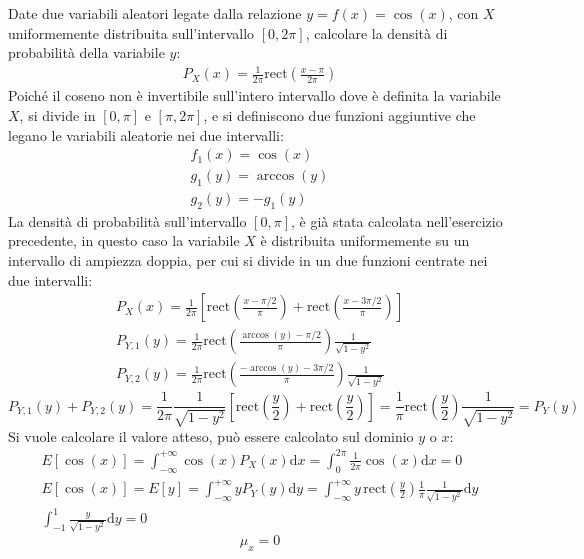 \documentclass{article}
\newcommand{\rect}{\mbox{rect}}
\newcommand{\df}{\mathrm{d}}
\begin{document}
Date due variabili aleatori legate dalla relazione $y=f(x)=\cos(x)$, con $X$ uniformemente distribuita sull'intervallo $[0,2\pi]$, calcolare la densità di probabilità 
della variabile $y$:
\begin{gather*}
    P_X(x)=\displaystyle\frac{1}{2\pi}\rect\left(\frac{x-\pi}{2\pi}\right)
\end{gather*}
Poiché il coseno non è invertibile sull'intero intervallo dove è definita la variabile $X$, si divide in $[0,\pi]$ e $[\pi,2\pi]$, e si definiscono due funzioni 
aggiuntive che legano le variabili aleatorie nei due intervalli:
\begin{gather*}
    f_1(x)=\cos(x)\\
    g_1(y)=\arccos(y)\\
    g_2(y)=-g_1(y)
\end{gather*}
La densità di probabilità sull'intervallo $[0,\pi]$, è già stata calcolata nell'esercizio precedente, in questo caso la variabile $X$ è distribuita uniformemente su un 
intervallo di ampiezza doppia, per cui si divide in un due funzioni centrate nei due intervalli:
\begin{gather*}
    P_X(x)=\displaystyle\frac{1}{2\pi}\left[\rect\left(\frac{x-\pi/2}{\pi}\right)+\rect\left(\frac{x-3\pi/2}{\pi}\right)\right]\\
    P_{Y,1}(y)=\displaystyle\frac{1}{2\pi}\rect\left(\frac{\arccos(y)-\pi/2}{\pi}\right)\frac{1}{\sqrt{1-y^2}}\\
    P_{Y,2}(y)=\displaystyle\frac{1}{2\pi}\rect\left(\frac{-\arccos(y)-3\pi/2}{\pi}\right)\frac{1}{\sqrt{1-y^2}}
\end{gather*}
\begin{equation}
    P_{Y,1}(y)+P_{Y,2}(y)=\displaystyle\frac{1}{2\pi}\frac{1}{\sqrt{1-y^2}}\left[\rect\left(\frac{y}{2}\right)+\rect\left(\frac{y}{2}\right)\right]=\frac{1}{\pi}\rect\left(\displaystyle\frac{y}{2}\right)\frac{1}{\sqrt{1-y^2}}=P_Y(y)
\end{equation}
Si vuole calcolare il valore atteso, può essere calcolato sul dominio $y$ o $x$:
\begin{gather*}
    E[\cos (x)]=\displaystyle\int_{-\infty}^{+\infty}\cos (x)P_X(x)\df x =\int_0^{2\pi}\frac{1}{2\pi}\cos(x)\df x=0\\
    E[\cos(x)]=E[y]=\displaystyle\int_{-\infty}^{+\infty}yP_Y(y)\df y=\int_{-\infty}^{+\infty}y\,\rect\left(\frac{y}{2}\right)\frac{1}{\pi}\frac{1}{\sqrt{1-y^2}}\df y\\
    \displaystyle\int_{-1}^1\frac{y}{\sqrt{1-y^2}}\df y=0
\end{gather*}
\begin{equation}
    \mu_x=0
\end{equation}
\end{document}
